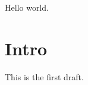 \documentclass{article}
\begin{document}
Hello world.
\section{Intro}
This is the first draft.
\end{document}
